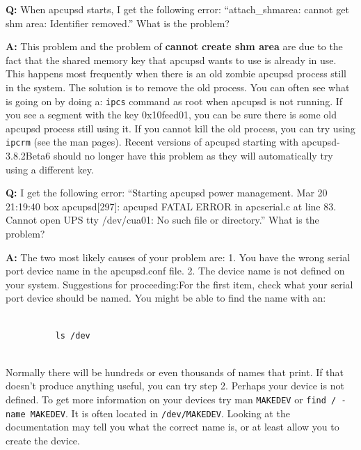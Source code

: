 {{{{{{{{{\begin{description}
{{{\item {\bf Q:}
When apcupsd starts, I get the following error: ``attach\_shmarea: cannot get
shm area: Identifier removed.'' What is the problem?  

\item {\bf A:}
This problem and the problem of {\bf cannot create shm area} are due to the
fact that the shared memory key that apcupsd wants to use is already in use.
This happens most frequently when there is an old zombie apcupsd process still
in the system.  The solution is to remove the old process.  You can often see
what is going on by doing a: {\tt ipcs} command as root when apcupsd is not
running. If you see a segment with the key 0x10feed01, you can be sure there
is some old apcupsd process still using it. If you cannot kill the old
process, you can try using {\tt ipcrm} (see the man pages).  Recent versions
of apcupsd starting with apcupsd-3.8.2Beta6 should no longer have this problem
as they will automatically try using a different key.  

\item {\bf Q:}
I get the following error: ``Starting apcupsd power management.  Mar 20
21:19:40 box apcupsd[297]: apcupsd FATAL ERROR in apcserial.c at line 83.
Cannot open UPS tty /dev/cua01: No such file or directory.'' What is the
problem?  

\item {\bf A:}
The two most likely causes of your problem are:  1. You have the wrong serial
port device name in the apcupsd.conf file. 2. The device name is not defined
on your system. Suggestions for proceeding:For the first item, check what your
serial port device should be named. You might be able to find the name with
an:  

\footnotesize
\begin{verbatim}
          
          ls /dev
     
\end{verbatim}
\normalsize

Normally there will be hundreds or even thousands of names that print. If that
doesn't produce anything useful, you can try step 2.  Perhaps your device is
not defined. To get more information on your devices try man {\tt MAKEDEV} or
{\tt find / -name MAKEDEV}.  It is often located in {\tt /dev/MAKEDEV}. 
Looking at the documentation may tell you what the correct name is, or at
least allow you to create the device.  

}}}
\end{description}}}}}}}}}}
